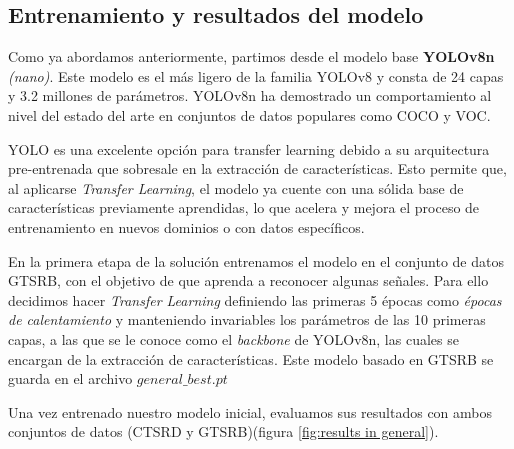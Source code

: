 \documentclass{article}
\begin{document}
\subsection{Entrenamiento y resultados del modelo}
Como ya abordamos anteriormente, partimos desde el modelo base \textbf{YOLOv8n} \textit{(nano)}. Este modelo es el más ligero de la familia YOLOv8 y consta de 24 capas y 3.2 millones de parámetros. YOLOv8n ha demostrado un comportamiento al nivel del estado del arte en conjuntos de datos populares como COCO y VOC. 

YOLO es una excelente opción para transfer learning debido a su arquitectura pre-entrenada que sobresale en la extracción de características. Esto permite que, al aplicarse \textit{Transfer Learning}, el modelo ya cuente con una sólida base de características previamente aprendidas, lo que acelera y mejora el proceso de entrenamiento en nuevos dominios o con datos específicos. 

En la primera etapa de la solución entrenamos el modelo en el conjunto de datos GTSRB, con el objetivo de que aprenda a reconocer algunas señales. Para ello decidimos hacer \textit{Transfer Learning} definiendo las primeras 5 épocas como \textit{épocas de calentamiento} y manteniendo invariables los parámetros de las 10 primeras capas, a las que se le conoce como el \textit{backbone} de YOLOv8n, las cuales se encargan de la extracción de características. Este modelo basado en GTSRB se guarda en el archivo $general\_best.pt$ 

Una vez entrenado nuestro modelo inicial, evaluamos sus resultados con ambos conjuntos de datos (CTSRD y GTSRB)(figura \ref{fig:results in general}).
\end{document}
